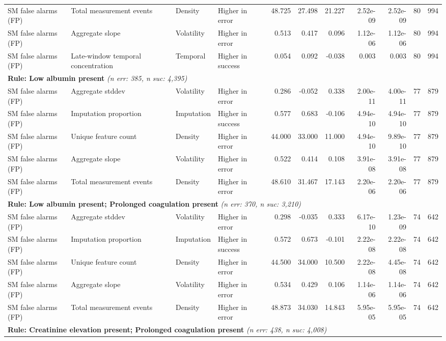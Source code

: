 \documentclass[border=0pt]{standalone}
\begin{document}
\begin{adjustbox}{width=\textwidth}
\begin{tabular}{@{}llllrrrrrrr@{}}
SM false alarms (FP) & Total measurement events & Density & Higher in error & 48.725 & 27.498 & 21.227 & 2.52e-09 & 2.52e-09 & 80 & 994 \\
SM false alarms (FP) & Aggregate slope & Volatility & Higher in error & 0.513 & 0.417 & 0.096 & 1.12e-06 & 1.12e-06 & 80 & 994 \\
SM false alarms (FP) & Late-window temporal concentration & Temporal & Higher in success & 0.054 & 0.092 & -0.038 & 0.003 & 0.003 & 80 & 994 \\
\multicolumn{11}{l}{\textbf{Rule: Low albumin present} \textit{(n err: 385, n suc: 4,395)}} \\
SM false alarms (FP) & Aggregate stddev & Volatility & Higher in error & 0.286 & -0.052 & 0.338 & 2.00e-11 & 4.00e-11 & 77 & 879 \\
SM false alarms (FP) & Imputation proportion & Imputation & Higher in success & 0.577 & 0.683 & -0.106 & 4.94e-10 & 4.94e-10 & 77 & 879 \\
SM false alarms (FP) & Unique feature count & Density & Higher in error & 44.000 & 33.000 & 11.000 & 4.94e-10 & 9.89e-10 & 77 & 879 \\
SM false alarms (FP) & Aggregate slope & Volatility & Higher in error & 0.522 & 0.414 & 0.108 & 3.91e-08 & 3.91e-08 & 77 & 879 \\
SM false alarms (FP) & Total measurement events & Density & Higher in error & 48.610 & 31.467 & 17.143 & 2.20e-06 & 2.20e-06 & 77 & 879 \\
\multicolumn{11}{l}{\textbf{Rule: Low albumin present; Prolonged coagulation present} \textit{(n err: 370, n suc: 3,210)}} \\
SM false alarms (FP) & Aggregate stddev & Volatility & Higher in error & 0.298 & -0.035 & 0.333 & 6.17e-10 & 1.23e-09 & 74 & 642 \\
SM false alarms (FP) & Imputation proportion & Imputation & Higher in success & 0.572 & 0.673 & -0.101 & 2.22e-08 & 2.22e-08 & 74 & 642 \\
SM false alarms (FP) & Unique feature count & Density & Higher in error & 44.500 & 34.000 & 10.500 & 2.22e-08 & 4.45e-08 & 74 & 642 \\
SM false alarms (FP) & Aggregate slope & Volatility & Higher in error & 0.534 & 0.429 & 0.106 & 1.14e-06 & 1.14e-06 & 74 & 642 \\
SM false alarms (FP) & Total measurement events & Density & Higher in error & 48.873 & 34.030 & 14.843 & 5.95e-05 & 5.95e-05 & 74 & 642 \\
\multicolumn{11}{l}{\textbf{Rule: Creatinine elevation present; Prolonged coagulation present} \textit{(n err: 438, n suc: 4,008)}} \\

\end{tabular}
\end{adjustbox}
\end{document}
